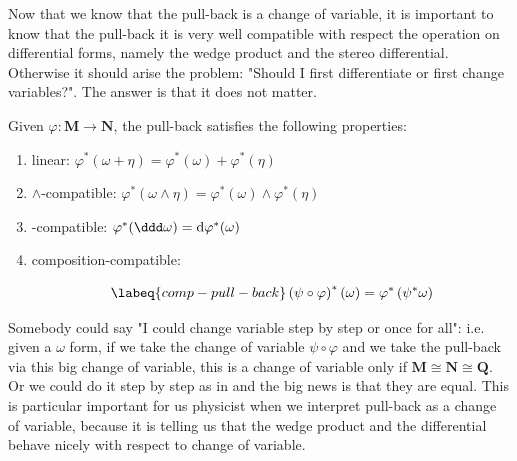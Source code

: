 \documentclass[../main.tex]{subfiles}
\begin{document}
Now that we know that the pull-back is a change of variable, it is important to know that the pull-back it is very well compatible with respect the operation on differential forms, namely the wedge product and the stereo differential. Otherwise it should arise the problem: "Should I first differentiate or first change variables?". The answer is that it does not matter.
\begin{proposition}
Given $\varphi:\mathbf{M}\to\mathbf{N}$, the pull-back satisfies the following properties:
\begin{enumerate}
    \item linear: $\varphi^\ast\left(\omega+\eta\right)=\varphi^\ast\left(\omega\right)+\varphi^\ast(\eta)$
    \item {\color{red}$\wedge$-compatible}:
    \(
    \varphi^\ast\left(\omega\wedge\eta\right)=\varphi^\ast(\omega)\wedge\varphi^\ast(\eta)
    \)
    \item {\color{red}\dd-compatible}: $\varphi^\ast(\ddd\omega)=\dd\varphi^\ast(\omega)$
    \item composition-compatible: 
    \begin{equation}\labeq{comp-pull-back}
        \left(\psi\circ\varphi\right)^\ast(\omega)=\varphi^\ast\left(\psi^\ast\omega\right)
    \end{equation}
\end{enumerate}
\end{proposition}
Somebody could say "I could change variable step by step or once for all": i.e. given a $\omega$ form, if we take the change of variable $\psi\circ\varphi$ and we take the pull-back via this big change of variable, this is a change of variable only if $\mathbf{M}\cong\mathbf{N}\cong\mathbf{Q}$. Or we could do it step by step as in  and the big news is that they are equal. This is particular important for us physicist when we interpret pull-back as a change of variable, because it is telling us that the wedge product and the differential behave nicely with respect to change of variable.
\end{document}
